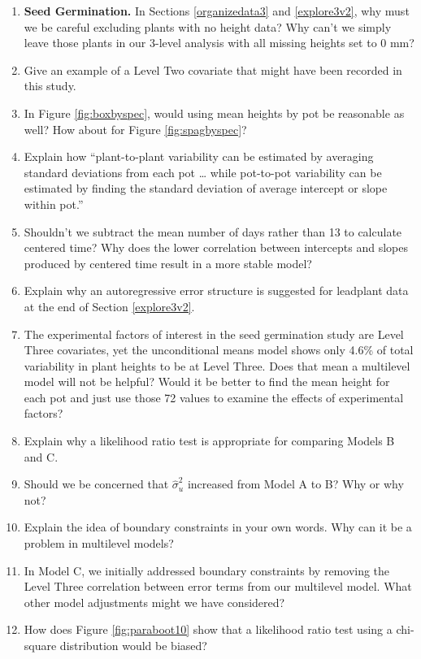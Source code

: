 \documentclass[
]{krantz}
\begin{document}
\begin{enumerate}
\def\labelenumi{\arabic{enumi}.}
\item
  \textbf{Seed Germination.} In Sections \ref{organizedata3} and \ref{explore3v2}, why must we be careful excluding plants with no height data? Why can't we simply leave those plants in our 3-level analysis with all missing heights set to 0 mm?
\item
  Give an example of a Level Two covariate that might have been recorded in this study.
\item
  In Figure \ref{fig:boxbyspec}, would using mean heights by pot be reasonable as well? How about for Figure \ref{fig:spagbyspec}?
\item
  Explain how ``plant-to-plant variability can be estimated by averaging standard deviations from each pot \ldots{} while pot-to-pot variability can be estimated by finding the standard deviation of average intercept or slope within pot.''
\item
  Shouldn't we subtract the mean number of days rather than 13 to calculate centered time? Why does the lower correlation between intercepts and slopes produced by centered time result in a more stable model?
\item
  Explain why an autoregressive error structure is suggested for leadplant data at the end of Section \ref{explore3v2}.
\item
  The experimental factors of interest in the seed germination study are Level Three covariates, yet the unconditional means model shows only 4.6\% of total variability in plant heights to be at Level Three. Does that mean a multilevel model will not be helpful? Would it be better to find the mean height for each pot and just use those 72 values to examine the effects of experimental factors?
\item
  Explain why a likelihood ratio test is appropriate for comparing Models B and C.
\item
  Should we be concerned that \(\hat{\sigma}_{u}^{2}\) increased from Model A to B? Why or why not?
\item
  Explain the idea of boundary constraints in your own words. Why can it be a problem in multilevel models?
\item
  In Model C, we initially addressed boundary constraints by removing the Level Three correlation between error terms from our multilevel model. What other model adjustments might we have considered?
\item
  How does Figure \ref{fig:paraboot10} show that a likelihood ratio test using a chi-square distribution would be biased?

\end{enumerate}
\end{document}
